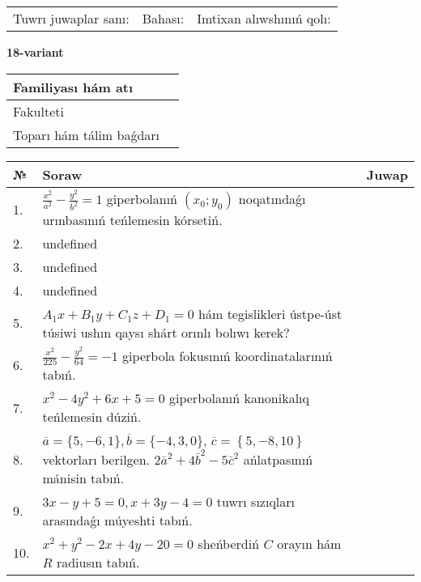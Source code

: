 \documentclass{article}
\begin{document}
\vspace{0.7cm}

\begin{tabular}{lll}
Tuwrı juwaplar sanı: \underline{\hspace{1cm}} & 
Bahası: \underline{\hspace{1cm}} & 
Imtixan alıwshınıń qolı: \underline{\hspace{2cm}} \\
\end{tabular}

\egroup

\newpage


\textbf{18-variant}\\

\bgroup
\def\arraystretch{1.6} %

\begin{tabular}{|m{5.7cm}|m{9.5cm}|}
\hline
Familiyası hám atı & \\
\hline
Fakulteti  & \\
\hline
Toparı hám tálim baǵdarı  & \\
\hline
\end{tabular}

\vspace{0.7cm}

\begin{tabular}{|m{0.7cm}|m{10cm}|m{4cm}|}
\hline
№ & Soraw & Juwap \\
\hline
1. & \(\frac{x^{2}}{a^{2}} - \frac{y^{2}}{b^{2}} = 1\) giperbolanıń \((x_{0};y_{0})\) noqatındaǵı urınbasınıń teńlemesin kórsetiń. &  \\
\hline
2. & undefined &  \\
\hline
3. & undefined &  \\
\hline
4. & undefined &  \\
\hline
5. & \(A_{1}x + B_{1}y + C_{1}z + D_{1} = 0\) hám tegislikleri ústpe-úst túsiwi ushın qaysı shárt orınlı bolıwı kerek? &  \\
\hline
6. & \(\frac{x^{2}}{225} - \frac{y^{2}}{64} = - 1\) giperbola fokusınıń koordinatalarınıń tabıń. &  \\
\hline
7. & \(x^{2} - 4 y^{2} + 6 x + 5 = 0\) giperbolanıń kanonikalıq teńlemesin dúziń. &  \\
\hline
8. & \(\overline{a} = \{5,- 6, 1 \}, \overline{b} = \{ - 4, 3, 0 \} \), \(\overline{c} = \left\{ 5,- 8, 10 \right\}\) vektorları berilgen. \(2{\bar{a}}^{2} + 4{\bar{b}}^{2} - 5{\bar{c}}^{2}\) ańlatpasınıń mánisin tabıń. &  \\
\hline
9. & \(3 x - y + 5 = 0, x + 3 y - 4 = 0\) tuwrı sızıqları arasındaǵı múyeshti tabıń. &  \\
\hline
10. & \(x^{2} + y^{2} - 2 x + 4 y - 20 = 0\) sheńberdiń \(C\) orayın hám \(R\) radiusın tabıń. & \\
\hline
\end{tabular}
\end{document}
